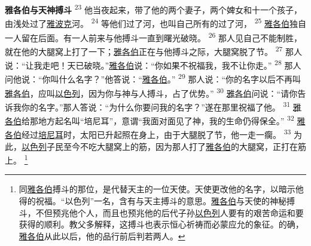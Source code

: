 \textbf{雅各伯与天神搏斗 }
\textsuperscript{23}
他当夜起来，带了他的两个妻子，两个婢女和十一个孩子，由浅处过了\uline{雅波克}河。
\textsuperscript{24}
等他们过了河，也叫自己所有的过了河，
\textsuperscript{25}
\uline{雅各伯}独自一人留在后面。有一人前来与他搏斗一直到曙光破晓。
\textsuperscript{26}
那人见自己不能制胜，就在他的大腿窝上打了一下；\uline{雅各伯}正在与他搏斗之际，大腿窝脱了节。
\textsuperscript{27}
那人说：“让我走吧！天已破晓。”\uline{雅各伯}说：“你如果不祝福我，我不让你走。”
\textsuperscript{28}
那人问他说：“你叫什么名字？”他答说：“\uline{雅各伯}。”
\textsuperscript{29}
那人说：“你的名字以后不再叫\uline{雅各伯}，应叫\uline{以色列}，因为你与神与人搏斗，占了优势。”
\textsuperscript{30}
\uline{雅各伯}问说：“请你告诉我你的名字。”那人答说：“为什么你要问我的名字？”遂在那里祝福了他。
\textsuperscript{31}
\uline{雅各伯}给那地方起名叫“培尼耳”，意谓“我面对面见了神，我的生命仍得保全。”
\textsuperscript{32}
\uline{雅各伯}经过\uline{培尼耳}时，太阳已升起照在身上，由于大腿脱了节，他一走一瘸。
\textsuperscript{33}
为此，\uline{以色列}子民至今不吃大腿窝上的筋，因为那人打了\uline{雅各伯}的大腿窝，正打在筋上。
\footnote{同\uline{雅各伯}搏斗的那位，是代替天主的一位天使。天使更改他的名字，以暗示他得的祝福。“以色列”一名，含有与天主搏斗的意思。\uline{雅各伯}与天使的神秘搏斗，不但预兆他个人，而且也预兆他的后代子孙\uline{以色列}人要有的艰苦命运和要获得的顺利。教父多解释，这搏斗也表示恒心祈祷而必蒙应允的象征。的确，\uline{雅各伯}从此以后，他的品行前后判若两人。}